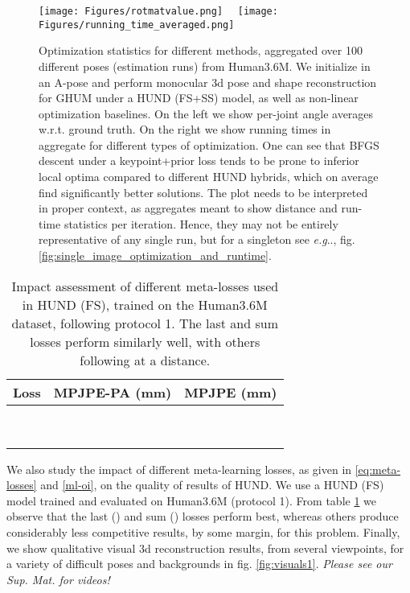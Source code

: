 \documentclass[final]{cvpr}
\makeatletter
\DeclareRobustCommand\onedot{\futurelet\@let@token\@onedot}
\def\@onedot{\ifx\@let@token.\else.\null\fi\xspace}
\def\eg{\emph{e.g}\onedot} \def\Eg{\emph{E.g}\onedot}
\makeatother
\begin{document}
\begin{figure*}[!htbp]
\vspace{-4mm}
\begin{center}
    \texttt{[image: Figures/rotmatvalue.png]}~~
    \texttt{[image: Figures/running\_time\_averaged.png]}    
\end{center}
\vspace{-3mm}
\caption{\small Optimization statistics for different methods, aggregated over 100 different poses (estimation runs) from Human3.6M. We initialize in an A-pose and perform monocular 3d pose and shape reconstruction for GHUM under a HUND (FS+SS) model, as well as non-linear optimization baselines. On the left we show per-joint angle averages w.r.t. ground truth. On the right we show running times in aggregate for different types of optimization. One can see that BFGS descent under a keypoint+prior loss tends to be prone to inferior local optima compared to different HUND hybrids, which on average find significantly better solutions. The plot needs to be interpreted in proper context, as aggregates meant to show distance and run-time statistics per iteration. Hence, they may not be entirely representative of any single run, but for a singleton see \eg, fig. \ref{fig:single_image_optimization_and_runtime}.
}
\label{fig:averaged_optimization_and_runtime}
\end{figure*}

\begin{table}[!htbp]
    \small
    \centering
    \begin{tabular}[t]{|l||r|r|}
    \hline
    \textbf{Loss}  & {MPJPE-PA (mm)} & {MPJPE (mm)}\\ 
    \hline
    \hline
     &  & \\
    \hline
     &  &  \\
    \hline
     &  & \\
    \hline
    \ &  & \\
    \hline
     &  & \\
    \hline
    \end{tabular}
    \caption{\small Impact assessment of different meta-losses used in HUND (FS), trained on the Human3.6M dataset, following protocol 1. The last and sum losses perform similarly well, with others following at a distance.}
\label{tbl:losses_ablation}
\end{table}
We also study the impact of different meta-learning losses, as given in \eqref{eq:meta-losses} and \eqref{ml-oi}, on the quality of results of HUND. We use a HUND (FS) model trained and evaluated on Human3.6M (protocol 1). From table \ref{tbl:losses_ablation} we observe that the last () and sum () losses perform best, whereas others produce considerably less competitive results, by some margin, for this problem.
Finally, we show qualitative visual 3d reconstruction results, from several viewpoints, for a variety of difficult poses and backgrounds in fig. \ref{fig:visuals1}. \emph{Please see our Sup. Mat. for videos!}
\end{document}
